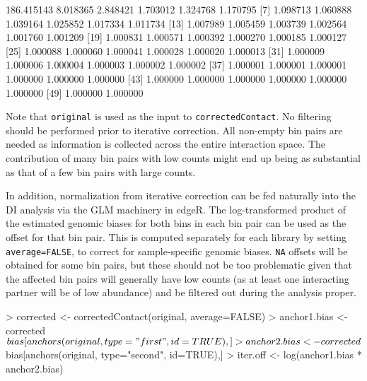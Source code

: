 \documentclass[12pt]{report}
\renewenvironment{Schunk}{\vspace{0pt}}{\vspace{0pt}}
\newcommand{\edgeR}{edgeR}
\newcommand{\code}[1]{{\small\texttt{#1}}}
\begin{document}
\begin{Schunk}
\begin{Soutput}
 [1] 186.415143   8.018365   2.848421   1.703012   1.324768   1.170795
 [7]   1.098713   1.060888   1.039164   1.025852   1.017334   1.011734
[13]   1.007989   1.005459   1.003739   1.002564   1.001760   1.001209
[19]   1.000831   1.000571   1.000392   1.000270   1.000185   1.000127
[25]   1.000088   1.000060   1.000041   1.000028   1.000020   1.000013
[31]   1.000009   1.000006   1.000004   1.000003   1.000002   1.000002
[37]   1.000001   1.000001   1.000001   1.000000   1.000000   1.000000
[43]   1.000000   1.000000   1.000000   1.000000   1.000000   1.000000
[49]   1.000000   1.000000
\end{Soutput}
\end{Schunk}

Note that \code{original} is used as the input to \code{correctedContact}.
No filtering should be performed prior to iterative correction.
All non-empty bin pairs are needed as information is collected across the entire interaction space.
The contribution of many bin pairs with low counts might end up being as substantial as that of a few bin pairs with large counts.

In addition, normalization from iterative correction can be fed naturally into the DI analysis via the GLM machinery in \edgeR{}.
The log-transformed product of the estimated genomic biases for both bins in each bin pair can be used as the offset for that bin pair.
This is computed separately for each library by setting \code{average=FALSE}, to correct for sample-specific genomic biases.
\code{NA} offsets will be obtained for some bin pairs, but these should not be too problematic given that the affected bin pairs will generally have low counts (as at least one interacting partner will be of low abundance) and be filtered out during the analysis proper.

\begin{Schunk}
\begin{Sinput}
> corrected <- correctedContact(original, average=FALSE)
> anchor1.bias <- corrected$bias[anchors(original, type="first", id=TRUE),]
> anchor2.bias <- corrected$bias[anchors(original, type="second", id=TRUE),]
> iter.off <- log(anchor1.bias * anchor2.bias)
\end{Sinput}
\end{Schunk}
\end{document}
